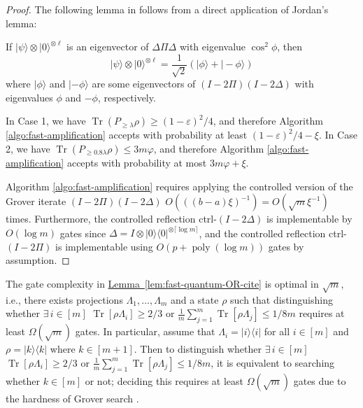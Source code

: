 \documentclass[a4paper,UKenglish,cleveref, autoref]{lipics-v2019}
\theoremstyle{remark}
\numberwithin{equation}{section}
\numberwithin{oracle}{section}
\numberwithin{remark}{section}
\newcommand{\lem}[1]{\hyperref[lem:#1]{Lemma~\ref*{lem:#1}}}
\def\>{\rangle}
\def\<{\langle}
\newcommand{\range}[1]{[#1]}
\newcommand{\ket}[1]{|#1\rangle}
\newcommand{\bra}[1]{\langle#1|}
\newcommand{\proj}[1]{\ket{#1}\bra{#1}}
\DeclareMathOperator{\poly}{poly}
\DeclareMathOperator{\tr}{Tr}
\DeclareMathOperator{\Tr}{Tr}
\begin{document}
\begin{proof}
The following lemma in \cite{nagaj2009fast} follows from a direct application of Jordan's lemma:
\begin{lemma}\cite[Section 2.1]{nagaj2009fast}
If $\ket{\psi} \otimes \ket{0}^{\otimes \ell}$ is an eigenvector of $\Delta\Pi\Delta$ with eigenvalue $\cos^2\phi$, then
\begin{equation}
\ket{\psi} \otimes \ket{0}^{\otimes \ell} = \frac{1}{\sqrt{2}} (\ket{\phi} + \ket{-\phi})
\end{equation}
where $\ket{\phi}$ and $\ket{-\phi}$ are some eigenvectors of $(I - 2\Pi)(I - 2\Delta)$ with eigenvalues $\phi$ and $-\phi$, respectively.
 \end{lemma}

In Case 1, we have $\tr(P_{\ge \lambda}\rho) \ge  (1-\varepsilon)^2/4$, and therefore Algorithm \ref{algo:fast-amplification} accepts with probability at least  $(1-\varepsilon)^2/4-\xi$. In Case 2, we have $\tr(P_{\ge 0.8\lambda}\rho) \le 3m\varphi$, and therefore Algorithm \ref{algo:fast-amplification} accepts with probability at most $3m\varphi + \xi$.

Algorithm \ref{algo:fast-amplification} requires applying the controlled version of the Grover iterate $(I - 2\Pi)(I - 2\Delta)$ $O(((b-a)\xi)^{-1}) = O(\sqrt{m}\xi^{-1})$ times. Furthermore, the controlled reflection ctrl-$(I - 2\Delta)$ is implementable by $O(\log m)$ gates since $\Delta = I \otimes \proj{0}^{\otimes \lceil \log m \rceil}$, and the controlled reflection ctrl-$(I - 2\Pi)$ is implementable using $O(p+\poly(\log m))$ gates by assumption.
\end{proof}

\begin{remark}
The gate complexity in \lem{fast-quantum-OR-cite} is optimal in $\sqrt{m}$, i.e., there exists projections $\Lambda_{1},\ldots,\Lambda_{m}$ and a state $\rho$ such that distinguishing whether $\exists\,i\in\range{m}$ $\Tr[\rho\Lambda_{i}]\geq 2/3$ or $\frac{1}{m}\sum_{j=1}^{m}\Tr[\rho\Lambda_{j}]\leq 1/8m$ requires at least $\Omega(\sqrt{m})$ gates. In particular, assume that $\Lambda_{i}=|i\>\<i|$ for all $i\in\range{m}$ and $\rho=|k\>\<k|$ where $k\in\range{m+1}$. Then to distinguish whether $\exists\,i\in\range{m}$ $\Tr[\rho\Lambda_{i}]\geq 2/3$ or $\frac{1}{m}\sum_{j=1}^{m}\Tr[\rho\Lambda_{j}]\leq 1/8m$, it is equivalent to searching whether $k\in\range{m}$ or not; deciding this requires at least $\Omega(\sqrt{m})$ gates due to the hardness of Grover search \cite{bennett1997strengths}.
\end{remark}
\end{document}
